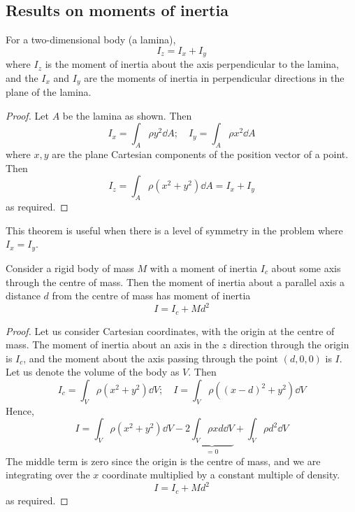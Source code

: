 \subsection{Results on moments of inertia}
\begin{theorem}
	For a two-dimensional body (a lamina),
	\[
		I_z = I_x + I_y
	\]
	where \(I_z\) is the moment of inertia about the axis perpendicular to the lamina, and the \(I_x\) and \(I_y\) are the moments of inertia in perpendicular directions in the plane of the lamina.
\end{theorem}
\begin{proof}
	Let \(A\) be the lamina as shown.
	Then
	\[
		I_x = \int_A \rho y^2 \dd{A};\quad I_y = \int_A \rho x^2 \dd{A}
	\]
	where \(x, y\) are the plane Cartesian components of the position vector of a point.
	Then
	\[
		I_z = \int_A \rho (x^2 + y^2) \dd{A} = I_x + I_y
	\]
	as required.
\end{proof}
\noindent This theorem is useful when there is a level of symmetry in the problem where \(I_x = I_y\).
\begin{theorem}
	Consider a rigid body of mass \(M\) with a moment of inertia \(I_c\) about some axis through the centre of mass.
	Then the moment of inertia about a parallel axis a distance \(d\) from the centre of mass has moment of inertia
	\[
		I = I_c + Md^2
	\]
\end{theorem}
\begin{proof}
	Let us consider Cartesian coordinates, with the origin at the centre of mass.
	The moment of inertia about an axis in the \(z\) direction through the origin is \(I_c\), and the moment about the axis passing through the point \((d, 0, 0)\) is \(I\).
	Let us denote the volume of the body as \(V\).
	Then
	\[
		I_c = \int_V \rho (x^2 + y^2) \dd{V};\quad I = \int_V \rho ((x-d)^2 + y^2) \dd{V}
	\]
	Hence,
	\[
		I = \int_V \rho (x^2 + y^2) \dd{V} - 2\underbrace{\int_V \rho xd \dd{V}}_{=0} + \int_V \rho d^2 \dd{V}
	\]
	The middle term is zero since the origin is the centre of mass, and we are integrating over the \(x\) coordinate multiplied by a constant multiple of density.
	\[
		I = I_c + Md^2
	\]
	as required.
\end{proof}

